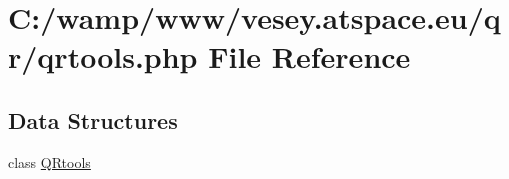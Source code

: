 \hypertarget{qrtools_8php}{\section{C\-:/wamp/www/vesey.atspace.\-eu/qr/qrtools.php File Reference}
\label{qrtools_8php}
}
\subsection*{Data Structures}
\begin{DoxyCompactItemize}
\item 
class \hyperlink{class_q_rtools}{Q\-Rtools}
\end{DoxyCompactItemize}
